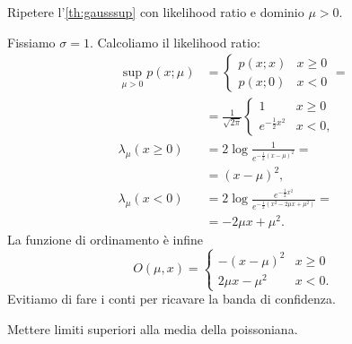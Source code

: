 \begin{exercise}
	Ripetere l'\autoref{th:gausssup} con likelihood ratio e dominio $\mu>0$.
\end{exercise}

\begin{solution*}
	Fissiamo $\sigma=1$.
	Calcoliamo il likelihood ratio:
	\begin{align*}
		\sup\limits_{\mu>0} p(x;\mu)
		&= \begin{cases}
			p(x;x) & x \ge 0 \\
			p(x;0) & x < 0
		\end{cases} = \\
		&= \frac1{\sqrt{2\pi}} \begin{cases}
			1                & x \ge 0 \\
			e^{-\frac12 x^2} & x < 0,
		\end{cases} \\
		\lambda_\mu(x\ge 0)
		&= 2\log \frac 1 {e^{-\frac12(x-\mu)^2}} = \\
		&= (x-\mu)^2, \\
		\lambda_\mu(x<0)
		&= 2\log \frac {e^{-\frac12 x^2}} {e^{-\frac12 (x^2 - 2\mu x + \mu^2)}} = \\
		&= -2\mu x + \mu^2.
	\end{align*}
	La funzione di ordinamento è infine
	\begin{equation*}
		O(\mu,x)
		= \begin{cases}
			- (x-\mu)^2 & x \ge 0 \\
			2\mu x - \mu^2 & x < 0.
		\end{cases}
	\end{equation*}
	Evitiamo di fare i conti per ricavare la banda di confidenza.
\end{solution*}

\begin{exercise}
	Mettere limiti superiori alla media della poissoniana.
\end{exercise}

